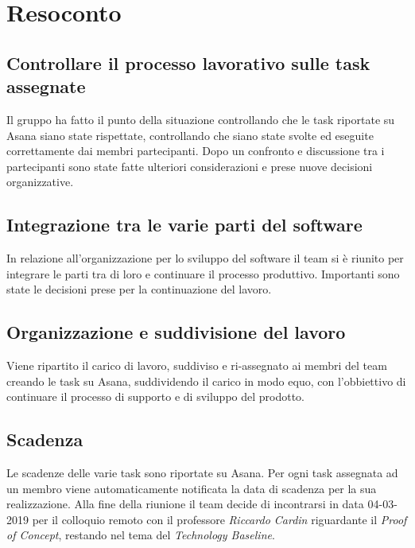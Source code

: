 \clearpage
\section{Resoconto}
	\subsection{Controllare il processo lavorativo sulle task assegnate}
	Il gruppo ha fatto il punto della situazione controllando che le task riportate su Asana siano state rispettate, controllando che siano state svolte ed eseguite correttamente dai membri partecipanti. 
	Dopo un confronto e discussione tra i partecipanti sono state fatte ulteriori considerazioni e prese nuove decisioni organizzative.
	\subsection{Integrazione tra le varie parti del software}
	In relazione all'organizzazione per lo sviluppo del software il team si è riunito per integrare le parti tra di loro e continuare il processo produttivo. Importanti sono state le decisioni prese per la continuazione del lavoro.
	\subsection{Organizzazione e suddivisione del lavoro}
	Viene ripartito il carico di lavoro, suddiviso e ri-assegnato ai membri del team creando le task su Asana, suddividendo il carico in modo equo, con l'obbiettivo di continuare il processo di supporto e di sviluppo del prodotto.
	\subsection{Scadenza}
	Le scadenze delle varie task sono riportate su Asana. Per ogni task assegnata ad un membro viene automaticamente notificata la data di scadenza per la sua realizzazione. Alla fine della riunione il team decide di incontrarsi in data 04-03-2019 per il colloquio remoto con il professore \textit{Riccardo Cardin} riguardante il \textit{Proof of Concept}, restando nel tema del \textit{Technology Baseline}.